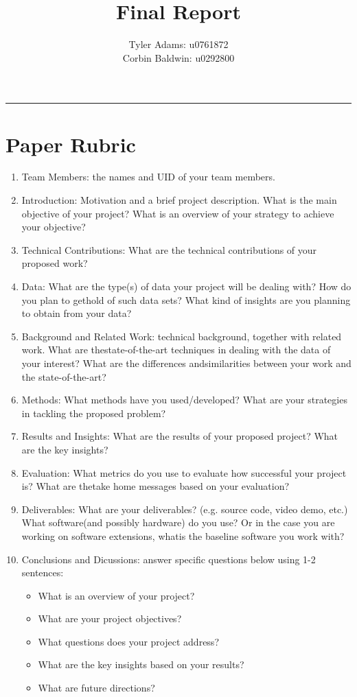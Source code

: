 \documentclass[12pt, fullpage,letterpaper]{article}
\title{Final Report}
\author{Tyler Adams: u0761872 \\Corbin Baldwin: u0292800}
\begin{document}
	\maketitle 
	\hrule 
	\vskip 0.5cm
	\section{Paper Rubric}
	\begin{enumerate}
		\item Team Members:  the names and UID of your team members.
		\item Introduction:  Motivation  and  a  brief  project  description.   What  is  the  main  objective  of  your project?  What is an overview of your strategy to achieve your objective?
		\item Technical Contributions:  What are the technical contributions of your proposed work?
		\item Data:  What are the type(s) of data your project will be dealing with?  How do you plan to gethold of such data sets?  What kind of insights are you planning to obtain from your data?
		\item Background and Related Work:  technical background, together with related work.  What are thestate-of-the-art techniques in dealing with the data of your interest?  What are the differences andsimilarities between your work and the state-of-the-art?
		\item Methods:   What  methods  have  you  used/developed?   What  are  your  strategies  in  tackling  the proposed problem?
		\item Results and Insights:  What are the results of your proposed project?  What are the key insights?
		\item Evaluation:  What metrics do you use to evaluate how successful your project is?  What are thetake home messages based on your evaluation?
		\item Deliverables:  What are your deliverables?  (e.g.  source code,  video demo,  etc.)  What software(and possibly hardware) do you use?  Or in the case you are working on software extensions, whatis the baseline software you work with?
		\item Conclusions and Dicussions:  answer specific questions below using 1-2 sentences:
		\begin{itemize}
			\item What is an overview of your project?
			\item What are your project objectives?
			\item What questions does your project address?
			\item What are the key insights based on your results?
			\item What are future directions?
		\end{itemize}
	\end{enumerate}	
	
\end{document}
